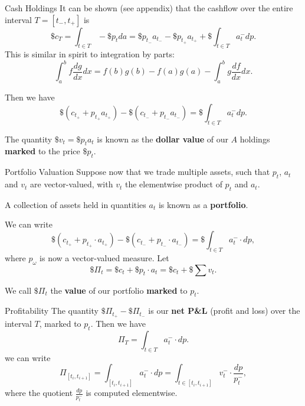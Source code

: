 \documentclass{beamer}
\begin{document}
\begin{frame}{Cash Holdings}
	It can be shown (see appendix) that the cashflow over the entire interval $T=[t_-,t_+]$ is
	$$\$c_T = \int_{t\in T} - \$p_t da = \$p_{t_-}a_{t_-} - \$p_{t_+}a_{t_+} + \$\int_{t\in T} a_t^- dp.$$
	This is similar in spirit to integration by parts:
	$$\int_a^b f \frac{dg}{dx} dx = f(b)g(b)-f(a)g(a) - \int_a^b g \frac{df}{dx} dx.$$

	Then we have
	$$\$(c_{t_+} + p_{t_+}a_{t_+}) - \$(c_{t_-} + p_{t_-}a_{t_-}) = \$\int_{t\in T} a_t^- dp.$$

	The quantity $\$v_t = \$p_t a_t$ is known as the \textbf{dollar value} of our $A$ holdings \textbf{marked} to the price $\$p_t$.%
\end{frame}

\begin{frame}{Portfolio Valuation}
	Suppose now that we trade multiple assets, such that $p_t$, $a_t$ and $v_t$ are vector-valued, with $v_t$ the elementwise product of $p_t$ and $a_t$.

	A collection of assets held in quantities $a_t$ is known as a \textbf{portfolio}.

	We can write
	$$\$(c_{t_+} + p_{t_+} \cdot a_{t_+}) - \$(c_{t_-} + p_{t_-} \cdot a_{t_-}) = \$\int_{t\in T} a_t^- \cdot dp,$$
	where $p_\omega$ is now a vector-valued measure. \pause Let
	$$\$\Pi_t = \$c_t + \$p_t\cdot a_t = \$c_t + \$\sum v_t.$$

	We call $\$\Pi_t$ the \textbf{value} of our portfolio \textbf{marked} to $p_t$.
\end{frame}

\begin{frame}{Profitability}
	The quantity $\$\Pi_{t_+} - \$\Pi_{t_-}$ is our \textbf{net P\&L} (profit and loss) over the interval $T$, marked to $p_t$.
	Then we have
	$$\Pi_T	= \int_{t\in T} a_t^- \cdot dp.$$
	we can write
	$$\Pi_{[t_i,t_{i+1}]} = \int_{[t_i,t_{i+1}]} a_t^- \cdot dp = \int_{t\in [t_i, t_{i+1}]} v_t^- \cdot \frac{dp}{p_t^-},$$
	where the quotient $\frac{dp}{p_t^-}$ is computed elementwise.
\end{frame}
\end{document}
